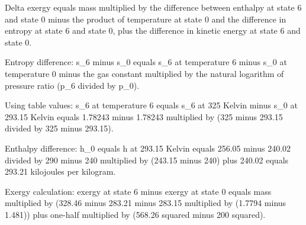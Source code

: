 Delta exergy equals mass multiplied by the difference between enthalpy at state 6 and state 0 minus the product of temperature at state 0 and the difference in entropy at state 6 and state 0, plus the difference in kinetic energy at state 6 and state 0.  

Entropy difference:  
s_6 minus s_0 equals s_6 at temperature 6 minus s_0 at temperature 0 minus the gas constant multiplied by the natural logarithm of pressure ratio (p_6 divided by p_0).  

Using table values:  
s_6 at temperature 6 equals s_6 at 325 Kelvin minus s_0 at 293.15 Kelvin equals 1.78243 minus 1.78243 multiplied by (325 minus 293.15 divided by 325 minus 293.15).  

Enthalpy difference:  
h_0 equals h at 293.15 Kelvin equals 256.05 minus 240.02 divided by 290 minus 240 multiplied by (243.15 minus 240) plus 240.02 equals 293.21 kilojoules per kilogram.  

Exergy calculation:  
exergy at state 6 minus exergy at state 0 equals mass multiplied by (328.46 minus 283.21 minus 283.15 multiplied by (1.7794 minus 1.481)) plus one-half multiplied by (568.26 squared minus 200 squared).